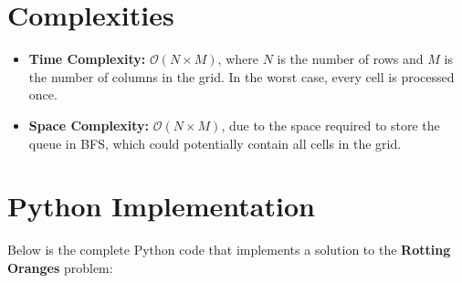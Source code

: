 
\section*{Complexities}

\begin{itemize}
    \item \textbf{Time Complexity:} \(\mathcal{O}(N \times M)\), where \(N\) is the number of rows and \(M\) is the number of columns in the grid. In the worst case, every cell is processed once.
    \item \textbf{Space Complexity:} \(\mathcal{O}(N \times M)\), due to the space required to store the queue in BFS, which could potentially contain all cells in the grid.
\end{itemize}

\newpage %
\section*{Python Implementation}


Below is the complete Python code that implements a solution to the \textbf{Rotting Oranges} problem:

